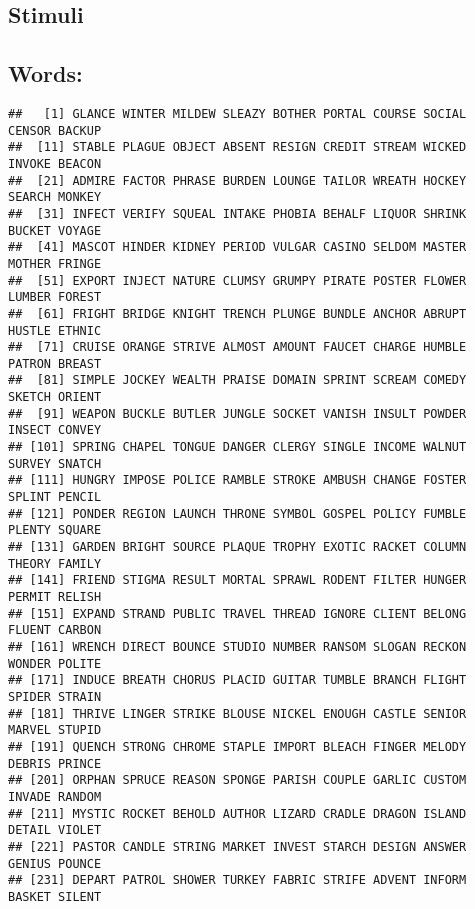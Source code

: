 \clearpage



\begin{appendix}
\hypertarget{stimuli}{%
\section{Stimuli}\label{stimuli}}

\hypertarget{words}{%
\subsection{Words:}\label{words}}

\begin{verbatim}
##   [1] GLANCE WINTER MILDEW SLEAZY BOTHER PORTAL COURSE SOCIAL CENSOR BACKUP
##  [11] STABLE PLAGUE OBJECT ABSENT RESIGN CREDIT STREAM WICKED INVOKE BEACON
##  [21] ADMIRE FACTOR PHRASE BURDEN LOUNGE TAILOR WREATH HOCKEY SEARCH MONKEY
##  [31] INFECT VERIFY SQUEAL INTAKE PHOBIA BEHALF LIQUOR SHRINK BUCKET VOYAGE
##  [41] MASCOT HINDER KIDNEY PERIOD VULGAR CASINO SELDOM MASTER MOTHER FRINGE
##  [51] EXPORT INJECT NATURE CLUMSY GRUMPY PIRATE POSTER FLOWER LUMBER FOREST
##  [61] FRIGHT BRIDGE KNIGHT TRENCH PLUNGE BUNDLE ANCHOR ABRUPT HUSTLE ETHNIC
##  [71] CRUISE ORANGE STRIVE ALMOST AMOUNT FAUCET CHARGE HUMBLE PATRON BREAST
##  [81] SIMPLE JOCKEY WEALTH PRAISE DOMAIN SPRINT SCREAM COMEDY SKETCH ORIENT
##  [91] WEAPON BUCKLE BUTLER JUNGLE SOCKET VANISH INSULT POWDER INSECT CONVEY
## [101] SPRING CHAPEL TONGUE DANGER CLERGY SINGLE INCOME WALNUT SURVEY SNATCH
## [111] HUNGRY IMPOSE POLICE RAMBLE STROKE AMBUSH CHANGE FOSTER SPLINT PENCIL
## [121] PONDER REGION LAUNCH THRONE SYMBOL GOSPEL POLICY FUMBLE PLENTY SQUARE
## [131] GARDEN BRIGHT SOURCE PLAQUE TROPHY EXOTIC RACKET COLUMN THEORY FAMILY
## [141] FRIEND STIGMA RESULT MORTAL SPRAWL RODENT FILTER HUNGER PERMIT RELISH
## [151] EXPAND STRAND PUBLIC TRAVEL THREAD IGNORE CLIENT BELONG FLUENT CARBON
## [161] WRENCH DIRECT BOUNCE STUDIO NUMBER RANSOM SLOGAN RECKON WONDER POLITE
## [171] INDUCE BREATH CHORUS PLACID GUITAR TUMBLE BRANCH FLIGHT SPIDER STRAIN
## [181] THRIVE LINGER STRIKE BLOUSE NICKEL ENOUGH CASTLE SENIOR MARVEL STUPID
## [191] QUENCH STRONG CHROME STAPLE IMPORT BLEACH FINGER MELODY DEBRIS PRINCE
## [201] ORPHAN SPRUCE REASON SPONGE PARISH COUPLE GARLIC CUSTOM INVADE RANDOM
## [211] MYSTIC ROCKET BEHOLD AUTHOR LIZARD CRADLE DRAGON ISLAND DETAIL VIOLET
## [221] PASTOR CANDLE STRING MARKET INVEST STARCH DESIGN ANSWER GENIUS POUNCE
## [231] DEPART PATROL SHOWER TURKEY FABRIC STRIFE ADVENT INFORM BASKET SILENT
\end{verbatim}


\end{appendix}

